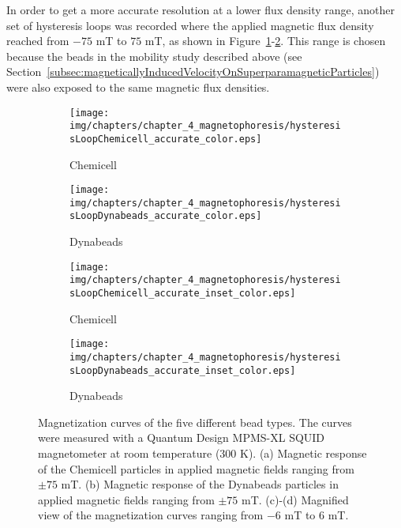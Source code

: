 In order to get a more accurate resolution at a lower flux density range, another set of hysteresis loops was recorded where the applied magnetic flux density reached from $-75$ mT to $75$ mT, as shown in Figure~\ref{fig:hysteresisLoopChemicell_accurate}-\ref{fig:hysteresisLoopDynabeads_accurate}. This range is chosen because the beads in the mobility study described above (see Section~\ref{subsec:magneticallyInducedVelocityOnSuperparamagneticParticles}) were also exposed to the same magnetic flux densities.

\begin{figure}[htb]
        \centering
        \begin{subfigure}[b]{0.48\textwidth}
                \texttt{[image: img/chapters/chapter\_4\_magnetophoresis/hysteresisLoopChemicell\_accurate\_color.eps]}
                \caption{Chemicell}
                \label{fig:hysteresisLoopChemicell_accurate}
        \end{subfigure}
        \hfill
        \begin{subfigure}[b]{0.48\textwidth}
                \texttt{[image: img/chapters/chapter\_4\_magnetophoresis/hysteresisLoopDynabeads\_accurate\_color.eps]}
                \caption{Dynabeads}
                \label{fig:hysteresisLoopDynabeads_accurate}
        \end{subfigure}
        \begin{subfigure}[b]{0.48\textwidth}
                \texttt{[image: img/chapters/chapter\_4\_magnetophoresis/hysteresisLoopChemicell\_accurate\_inset\_color.eps]}
                \caption{Chemicell}
                \label{fig:hysteresisLoopChemicell_accurate_inset}
        \end{subfigure}
        \hfill
        \begin{subfigure}[b]{0.48\textwidth}
                \texttt{[image: img/chapters/chapter\_4\_magnetophoresis/hysteresisLoopDynabeads\_accurate\_inset\_color.eps]}
                \caption{Dynabeads}
                \label{fig:hysteresisLoopDynabeads_accurate_inset}
        \end{subfigure}
        \caption[Magnetization curves of Chemicell and Dynabeads particles in the range of $\pm75$ mT]{Magnetization curves of the five different bead types. The curves were measured with a Quantum Design MPMS-XL SQUID magnetometer at room temperature ($300$ K). (a) Magnetic response of the Chemicell particles in applied magnetic fields ranging from $\pm75$ mT. (b) Magnetic response of the Dynabeads particles in applied magnetic fields ranging from $\pm75$ mT. (c)-(d) Magnified view of the magnetization curves ranging from $-6$ mT to $6$ mT.}
\label{fig:histeresisLoopParticleManufacturer_accurate}
\end{figure}

